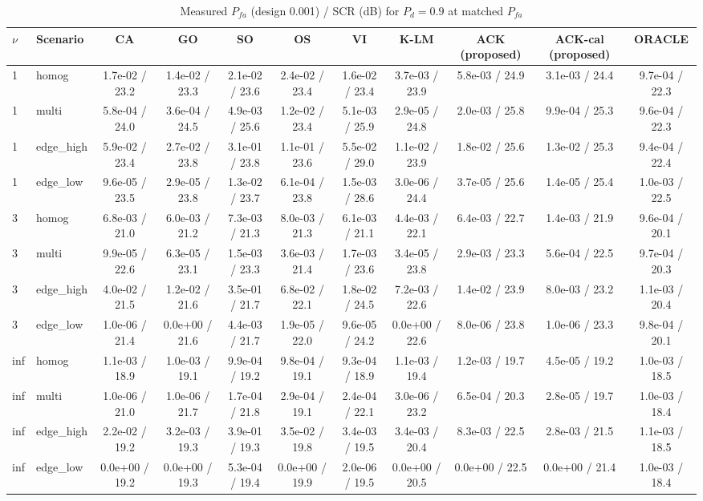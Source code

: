 \begin{table}[t]\centering\caption{Measured $P_{fa}$ (design 0.001) / SCR (dB) for $P_d=0.9$ at matched $P_{fa}$}
\begin{tabular}{llccccccccc}\toprule
$\nu$ & Scenario & CA & GO & SO & OS & VI & K-LM & ACK (proposed) & ACK-cal (proposed) & ORACLE \\\midrule
1 & homog & 1.7e-02 / 23.2 & 1.4e-02 / 23.3 & 2.1e-02 / 23.6 & 2.4e-02 / 23.4 & 1.6e-02 / 23.4 & 3.7e-03 / 23.9 & 5.8e-03 / 24.9 & 3.1e-03 / 24.4 & 9.7e-04 / 22.3 \\
1 & multi & 5.8e-04 / 24.0 & 3.6e-04 / 24.5 & 4.9e-03 / 25.6 & 1.2e-02 / 23.4 & 5.1e-03 / 25.9 & 2.9e-05 / 24.8 & 2.0e-03 / 25.8 & 9.9e-04 / 25.3 & 9.6e-04 / 22.3 \\
1 & edge_high & 5.9e-02 / 23.4 & 2.7e-02 / 23.8 & 3.1e-01 / 23.8 & 1.1e-01 / 23.6 & 5.5e-02 / 29.0 & 1.1e-02 / 23.9 & 1.8e-02 / 25.6 & 1.3e-02 / 25.3 & 9.4e-04 / 22.4 \\
1 & edge_low & 9.6e-05 / 23.5 & 2.9e-05 / 23.8 & 1.3e-02 / 23.7 & 6.1e-04 / 23.8 & 1.5e-03 / 28.6 & 3.0e-06 / 24.4 & 3.7e-05 / 25.6 & 1.4e-05 / 25.4 & 1.0e-03 / 22.5 \\
3 & homog & 6.8e-03 / 21.0 & 6.0e-03 / 21.2 & 7.3e-03 / 21.3 & 8.0e-03 / 21.3 & 6.1e-03 / 21.1 & 4.4e-03 / 22.1 & 6.4e-03 / 22.7 & 1.4e-03 / 21.9 & 9.6e-04 / 20.1 \\
3 & multi & 9.9e-05 / 22.6 & 6.3e-05 / 23.1 & 1.5e-03 / 23.3 & 3.6e-03 / 21.4 & 1.7e-03 / 23.6 & 3.4e-05 / 23.8 & 2.9e-03 / 23.3 & 5.6e-04 / 22.5 & 9.7e-04 / 20.3 \\
3 & edge_high & 4.0e-02 / 21.5 & 1.2e-02 / 21.6 & 3.5e-01 / 21.7 & 6.8e-02 / 22.1 & 1.8e-02 / 24.5 & 7.2e-03 / 22.6 & 1.4e-02 / 23.9 & 8.0e-03 / 23.2 & 1.1e-03 / 20.4 \\
3 & edge_low & 1.0e-06 / 21.4 & 0.0e+00 / 21.6 & 4.4e-03 / 21.7 & 1.9e-05 / 22.0 & 9.6e-05 / 24.2 & 0.0e+00 / 22.6 & 8.0e-06 / 23.8 & 1.0e-06 / 23.3 & 9.8e-04 / 20.1 \\
inf & homog & 1.1e-03 / 18.9 & 1.0e-03 / 19.1 & 9.9e-04 / 19.2 & 9.8e-04 / 19.1 & 9.3e-04 / 18.9 & 1.1e-03 / 19.4 & 1.2e-03 / 19.7 & 4.5e-05 / 19.2 & 1.0e-03 / 18.5 \\
inf & multi & 1.0e-06 / 21.0 & 1.0e-06 / 21.7 & 1.7e-04 / 21.8 & 2.9e-04 / 19.1 & 2.4e-04 / 22.1 & 3.0e-06 / 23.2 & 6.5e-04 / 20.3 & 2.8e-05 / 19.7 & 1.0e-03 / 18.4 \\
inf & edge_high & 2.2e-02 / 19.2 & 3.2e-03 / 19.3 & 3.9e-01 / 19.3 & 3.5e-02 / 19.8 & 3.4e-03 / 19.5 & 3.4e-03 / 20.4 & 8.3e-03 / 22.5 & 2.8e-03 / 21.5 & 1.1e-03 / 18.5 \\
inf & edge_low & 0.0e+00 / 19.2 & 0.0e+00 / 19.3 & 5.3e-04 / 19.4 & 0.0e+00 / 19.9 & 2.0e-06 / 19.5 & 0.0e+00 / 20.5 & 0.0e+00 / 22.5 & 0.0e+00 / 21.4 & 1.0e-03 / 18.4 \\
\bottomrule\end{tabular}\end{table}
